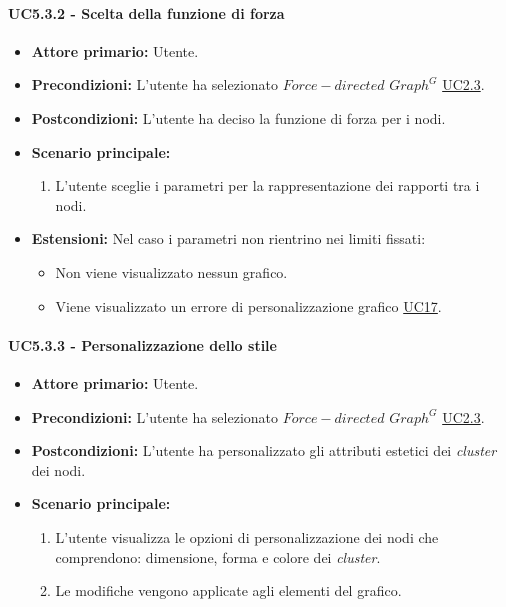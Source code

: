 \paragraph{UC5.3.2 - Scelta della funzione di forza}
\label{sec:UC5.3.2}
    \begin{itemize}
        \item \textbf{Attore primario:} Utente.
        \item \textbf{Precondizioni:} L'utente ha selezionato $Force-directed$ $Graph^{G}$ \hyperref[sec:UC2.3]{UC2.3}.
	    \item \textbf{Postcondizioni:} L'utente ha deciso la funzione di forza per i nodi.
	    \item \textbf{Scenario principale:} 
	    \begin{enumerate}
	    		\item L'utente sceglie i parametri per la rappresentazione dei rapporti tra i nodi.
		\end{enumerate}
	    \item \textbf{Estensioni:} Nel caso i parametri non rientrino nei limiti fissati:
              \begin{itemize}
                  \item Non viene visualizzato nessun grafico.
                  \item Viene visualizzato un errore di personalizzazione grafico \hyperref[sec:UC17 - Errore di personalizzazione]{UC17}.
              \end{itemize}
    \end{itemize}
\paragraph{UC5.3.3 - Personalizzazione dello stile}
\label{sec:UC5.3.3}
    \begin{itemize}
        \item \textbf{Attore primario:} Utente.
        \item \textbf{Precondizioni:} L'utente ha selezionato $Force-directed$ $Graph^{G}$ \hyperref[sec:UC2.3]{UC2.3}.
	    \item \textbf{Postcondizioni:} L'utente ha personalizzato gli attributi estetici dei \textit{cluster} dei nodi.
	    \item \textbf{Scenario principale:} 
	    \begin{enumerate}
                \item L'utente visualizza le opzioni di personalizzazione dei nodi che comprendono: dimensione, forma e colore dei \textit{cluster}.
	    		\item Le modifiche vengono applicate agli elementi del grafico.
		\end{enumerate}
    \end{itemize}

